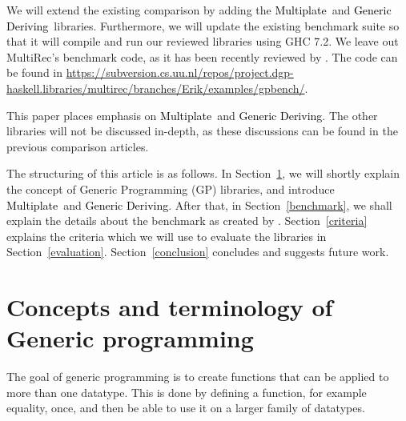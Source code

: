 \documentclass[twocolumn,11pt,a4paper]{article}
\newcommand{\sref}[1]{Section~\ref{#1}}
\newcommand{\multiplate}{\textcolor{black}{Multiplate}}
\newcommand{\genericderiving}{\textcolor{black}{Generic Deriving}}
\begin{document}
We will extend the existing comparison by adding the \multiplate\ and \genericderiving\ libraries.
Furthermore, we will update the existing benchmark suite so that it will compile and run our reviewed libraries using GHC 7.2. We leave out MultiRec's benchmark code, as it has been recently reviewed by \citet{Rodriguez:2009:phd}. The code can be found in \href{https://subversion.cs.uu.nl/repos/project.dgp-haskell.libraries/multirec/branches/Erik/examples/gpbench/}{https://subversion.cs.uu.nl/repos/project.dgp-haskell.libraries/multirec/branches/Erik/\newline examples/gpbench/}.

This paper places emphasis on \multiplate\ and \genericderiving. The other libraries will not be discussed in-depth, as these discussions can be found in the previous comparison articles.

The structuring of this article is as follows.
In \sref{concepts}, we will shortly explain the concept of Generic Programming (GP) libraries, and introduce \multiplate\ and \genericderiving. 
After that, in \sref{benchmark}, we shall explain the details about the benchmark as created by \citet{Rodriguez:2008:art}. 
\sref{criteria} explains the criteria which we will use to evaluate the libraries in \sref{evaluation}. \sref{conclusion} concludes and suggests future work.


\section{Concepts and terminology of Generic programming}\label{concepts}
The goal of generic programming is to create functions that can be applied to more than one datatype.
This is done by defining a function, for example equality, once, and then be able to use it on a larger family of datatypes.
\end{document}
